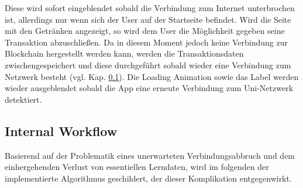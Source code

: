 Diese wird sofort eingeblendet sobald die Verbindung zum Internet unterbrochen ist, allerdings nur wenn sich der User auf der Startseite befindet. Wird die Seite mit den Getränken angezeigt, so wird dem User die Möglichkeit gegeben seine Transaktion abzuschließen. Da in diesem Moment jedoch keine Verbindung zur Blockchain hergestellt werden kann, werden die Transaktionsdaten zwischengespeichert und diese durchgeführt sobald wieder eine Verbindung zum Netzwerk besteht (vgl. Kap. \ref{subsec:internalFlow}).
Die Loading Animation sowie das  Label werden wieder ausgeblendet sobald die App eine erneute Verbindung zum Uni-Netzwerk detektiert.

\subsection{Internal Workflow}
\label{subsec:internalFlow}
Basierend auf der Problematik eines unerwarteten Verbindungsabbruch und dem einhergehenden Verlust von essentiellen Lerndaten, wird im folgenden der implementierte Algorithmus geschildert, der dieser Komplikation entgegenwirkt. 

